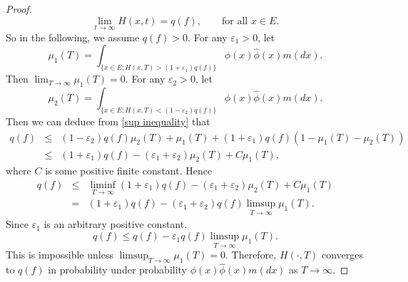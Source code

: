 \documentclass[12pt,a4paper]{amsart}
\numberwithin{equation}{section}
\theoremstyle{plain}
\theoremstyle{definition}
\theoremstyle{remark}
\begin{document}
\begin{proof}
\begin{equation}
 \lim_{t\rightarrow\infty}H(x,t)=q(f),\qquad \mbox{for all}\,\, x\in E.
 \end{equation}
  So in the
following, we assume $q(f)>0$.
 For any $\varepsilon_1>0$, let
$$
\mu_1(T)=\int_{\{x\in
E;H(x,T)>(1+\varepsilon_1)q(f)\}}\phi(x)\hat\phi(x)m(dx).
$$
Then $\lim_{T\rightarrow\infty}\mu_1(T)=0.$  For any $\varepsilon_2>0$, let
$$
\mu_2(T)=\int_{\{x\in
E;H(x,T)<(1-\varepsilon_2)q(f)\}}\phi(x)\hat\phi(x)m(dx).
$$
 Then we can deduce from \eqref{sup inequality} that
\begin{eqnarray}\label{sublimitinprob}
q(f)&\leq&
(1-\varepsilon_2)q(f)\mu_2(T)+\mu_1(T)+(1+\varepsilon_1)q(f)(1-\mu_1(T)-\mu_2(T))\\
&\le
&(1+\varepsilon_1)q(f)-(\varepsilon_1+\varepsilon_2)\mu_2(T)+C\mu_1(T),
\end{eqnarray}
where $C$ is some positive finite constant.  Hence
\begin{eqnarray*}\label{sublimitinequl}
q(f)&\leq&
\liminf_{T\rightarrow\infty}(1+\varepsilon_1)q(f)-(\varepsilon_1+\varepsilon_2)\mu_2(T)+C\mu_1(T)\\
&=&(1+\varepsilon_1)q(f)-(\varepsilon_1+\varepsilon_2)q(f)\limsup_{T\rightarrow\infty}\mu_1(T).
\end{eqnarray*}
Since $\varepsilon_1$ is an arbitrary positive constant.
\[
q(f)\leq q(f)-\varepsilon_1 q(f)\limsup_{T\rightarrow\infty}\mu_1(T).
\]
This is impossible unless $\limsup_{T\rightarrow\infty}\mu_1(T)=0.$
Therefore, $H(\cdot,T)$ converges to $q(f)$ in probability under probability $\phi(x)\hat{\phi}(x)m(dx)$ as $T\to\infty$.



\end{proof}
\end{document}

